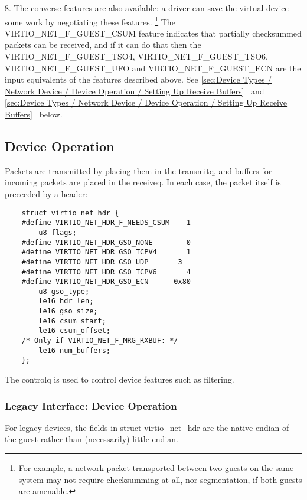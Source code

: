 8. The converse features are also available: a driver can save
  the virtual device some work by negotiating these features.
\footnote{For example, a network packet transported between two guests on
the same system may not require checksumming at all, nor segmentation,
if both guests are amenable.
}
   The VIRTIO_NET_F_GUEST_CSUM feature indicates that partially
  checksummed packets can be received, and if it can do that then
  the VIRTIO_NET_F_GUEST_TSO4, VIRTIO_NET_F_GUEST_TSO6,
  VIRTIO_NET_F_GUEST_UFO and VIRTIO_NET_F_GUEST_ECN are the input
  equivalents of the features described above.
  See \ref{sec:Device Types / Network Device / Device Operation / Setting Up Receive Buffers}~ and \ref{sec:Device Types / Network Device / Device Operation / Setting Up Receive Buffers}~ below.

\subsection{Device Operation}\label{sec:Device Types / Network Device / Device Operation}

Packets are transmitted by placing them in the transmitq, and
buffers for incoming packets are placed in the receiveq. In each
case, the packet itself is preceeded by a header:

\begin{lstlisting}
	struct virtio_net_hdr {
	#define VIRTIO_NET_HDR_F_NEEDS_CSUM    1
		u8 flags;
	#define VIRTIO_NET_HDR_GSO_NONE        0
	#define VIRTIO_NET_HDR_GSO_TCPV4       1
	#define VIRTIO_NET_HDR_GSO_UDP		 3
	#define VIRTIO_NET_HDR_GSO_TCPV6       4
	#define VIRTIO_NET_HDR_GSO_ECN      0x80
		u8 gso_type;
		le16 hdr_len;
		le16 gso_size;
		le16 csum_start;
		le16 csum_offset;
	/* Only if VIRTIO_NET_F_MRG_RXBUF: */
		le16 num_buffers;
	};
\end{lstlisting}

The controlq is used to control device features such as
filtering.

\subsubsection{Legacy Interface: Device Operation}\label{sec:Device Types / Network Device / Device Operation / Legacy Interface: Device Operation}
For legacy devices, the fields in struct virtio_net_hdr are the
native endian of the guest rather than (necessarily) little-endian.

